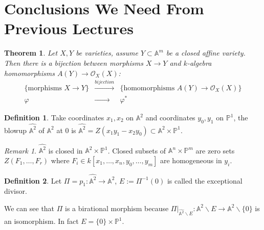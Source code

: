 \documentclass{amsart}
\theoremstyle{plain}
\newtheorem{theorem}{Theorem}
\theoremstyle{definition}
\newtheorem{definition}{Definition}
\theoremstyle{remark}
\newtheorem*{remark}{Remark}
\numberwithin{equation}{section}
\begin{document}
\section{Conclusions We Need From Previous Lectures }
 \begin{theorem}\label{12}
 	Let $ X,Y $ be varieties, assume $ Y\subset \mathbb{A}^m $ be a closed affine variety. Then there is a bijection between morphisms $ X\to Y $ and $ k $-algebra homomorphisms $ A(Y)\to \mathcal{O}_X(X) $:
 	$$\begin{array}{ccc}
 	\{ \text{morphisms } X\to Y \} & \xrightarrow{bijection} & \{ \text{homomorphisms }A(Y)\to \mathcal{O}_X(X) \} \\
 	\varphi & \xrightarrow{\qquad\quad} & \varphi^\ast
 	\end{array}$$
 \end{theorem}
 \begin{definition}
 	Take coordinates $ x_1,x_2 $ on $ \mathbb{A}^2 $ and coordinates $ y_0,y_1 $ on $ \mathbb{P}^1 $, the blowup $ \hat{\mathbb{A}^2} $ of $ \mathbb{A}^2 $ at $ 0 $ is $ \hat{\mathbb{A}^2}=Z(x_1y_1-x_2y_0)\subset\mathbb{A}^2\times \mathbb{P}^1 $.
 \end{definition}
 \begin{remark}
 	$ \hat{\mathbb{A}^2} $ is closed in $ \mathbb{A}^2\times\mathbb{P}^1 $. Closed subsets of $ \mathbb{A}^n\times\mathbb{P}^m $ are zero sets $ Z(F_1,\dots,F_r) $ where $ F_i\in k[x_1,\dots,x_n,y_0,\dots,y_m] $ are homogeneous in $ y_i $.
 \end{remark}
 \begin{definition}
 	Let $ \Pi=p_1:\hat{\mathbb{A}^2}\to \mathbb{A}^2 $, $ E:=\Pi^{-1}(0) $ is called the exceptional divisor. 
 \end{definition}
 	We can see that $ \Pi $ is a birational morphism because $ \Pi|_{\hat{\mathbb{A}^2}\backslash E}:\mathbb{A}^2\backslash E\to \mathbb{A}^2\backslash \{ 0 \} $ is an isomorphism. In fact $ E=\{ 0 \}\times \mathbb{P}^1 $. 
\end{document}
